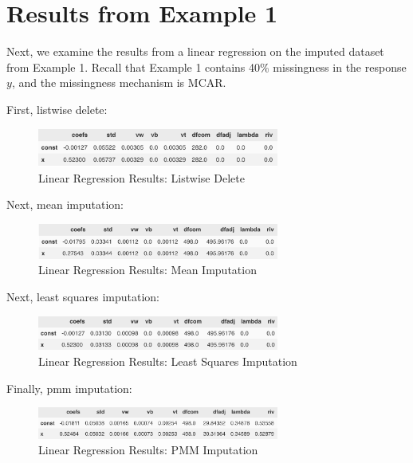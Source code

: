 \documentclass[12pt,oneside]{chicagocapstone}
\begin{document}
\section*{Results from Example 1}\label{results-from-example-1}

Next, we examine the results from a linear regression on the imputed
dataset from Example 1. Recall that Example 1 contains 40\% missingness
in the response \(y\), and the missingness mechanism is MCAR.

First, listwise delete:
\begin{figure}

{\centering \includegraphics[width=300px]{figure/mcar-listwise-delete} 

}

\caption{Linear Regression Results: Listwise Delete}\label{fig:mcar-listwise-delete}
\end{figure}
Next, mean imputation:
\begin{figure}

{\centering \includegraphics[width=300px]{figure/mcar-mean} 

}

\caption{Linear Regression Results: Mean Imputation}\label{fig:mcar-mean}
\end{figure}
Next, least squares imputation:
\begin{figure}

{\centering \includegraphics[width=300px]{figure/mcar-ls} 

}

\caption{Linear Regression Results: Least Squares Imputation}\label{fig:mcar-ls}
\end{figure}
Finally, pmm imputation:
\begin{figure}

{\centering \includegraphics[width=300px]{figure/mcar-pmm} 

}

\caption{Linear Regression Results: PMM Imputation}\label{fig:mcar-pmm}
\end{figure}
\end{document}

